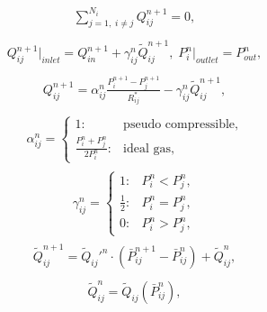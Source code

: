 \documentclass[a4paper,12pt]{extreport}
\begin{document}
    \begin{eqnarray}
        \begin{gathered}
            \sum^{N_{i}}_{j=1, \; i\neq j} Q^{n+1}_{ij} = 0,
        \end{gathered}
    \end{eqnarray}
    \begin{eqnarray}
        \begin{gathered}
            Q^{n+1}_{ij}\Big|_{inlet} = Q^{n+1}_{in}+\gamma^n_{ij} \tilde{Q}^{n+1}_{ij}, \;
            P^{n}_{i}\Big|_{outlet} = P^{n}_{out},
        \end{gathered}
    \end{eqnarray}
    \begin{eqnarray}
        \begin{gathered}
            Q^{n+1}_{ij} = \alpha^n_{ij} \frac{P^{n+1}_{i} - P^{n+1}_{j}}{R^*_{ij}} - \gamma^n_{ij} \tilde{Q}^{n+1}_{ij},
        \end{gathered}
    \end{eqnarray}
    \begin{eqnarray}
        \begin{gathered}
            \alpha^n_{ij} =\begin{cases}
                               1: &\text{pseudo compressible},\\
                               \frac{P^n_i + P^n_j}{2P^n_i}: &\text{ideal gas},
            \end{cases}
        \end{gathered}
    \end{eqnarray}
    \begin{eqnarray}
        \gamma^n_{ij} =\begin{cases}
                           1: & P^{n}_{i} < P^{n}_{j},\\
                           \frac{1}{2} : & P^{n}_{i} = P^{n}_{j},\\
                           0: & P^{n}_{i} > P^{n}_{j},
        \end{cases}
    \end{eqnarray}
    \begin{eqnarray}
        \begin{gathered}
            \tilde{Q}_{ij}^{n+1} = \tilde{Q}_{ij}'^n \cdot \left(\bar{P}_{ij}^{n+1}-\bar{P}_{ij}^n\right)+\tilde{Q}_{ij}^n,
        \end{gathered}
    \end{eqnarray}
    \begin{eqnarray}
        \begin{gathered}
            \tilde{Q}_{ij}^{n} = \tilde{Q}_{ij}\left(\bar{P}_{ij}^n\right),
        \end{gathered}
    \end{eqnarray}
\end{document}
